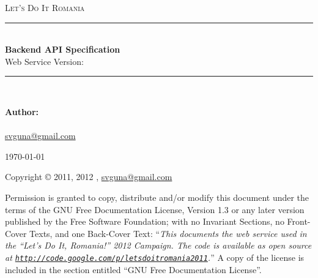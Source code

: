 \begin{titlepage}
\begin{center}
\newcommand{\HRule}{\rule{\linewidth}{0.5mm}}

\textsc{\LARGE Let's Do It Romania}\\[7cm]

\HRule\\[.5cm]
{\huge \bfseries Backend API Specification}\\[.5cm]
{\Large Web Service Version: \version}\\[.3cm]
\HRule\\[8cm]

\begin{flushleft}
{\large
\textbf{Author:}\\
\stef\\
\href{mailto:svguna@gmail.com}{svguna@gmail.com}
}
\end{flushleft}

\vfill
{\large \today}

\end{center}
\end{titlepage}

\begin{center}
\begin{minipage}[t]{.9\textwidth}
  Copyright \copyright{} 2011, 2012 \stef,
  \href{mailto:svguna@gmail.com}{svguna@gmail.com}

\bigskip
Permission is granted to copy, distribute and/or modify this document under the
terms of the GNU Free Documentation License, Version 1.3 or any later version
published by the Free Software Foundation; with no Invariant Sections, no
Front-Cover Texts, and one Back-Cover Text: ``\emph{This documents the web
service used in the ``Let's Do It, Romania!'' 2012 Campaign. The code is
available as open source at
\href{http://code.google.com/p/letsdoitromania2011/}{\texttt{http://code.google.com/p/letsdoitromania2011}}.}''
A copy of the license is included in the section entitled ``GNU Free
Documentation License''.
\end{minipage}

\end{center}

\vfill

\thispagestyle{empty}
\clearpage
\setcounter{page}{1}

